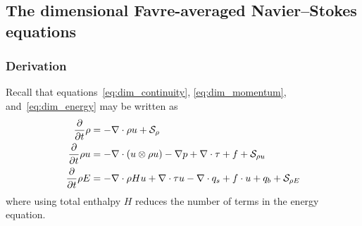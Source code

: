 \subsection{The dimensional Favre-averaged Navier--Stokes equations}

\subsubsection{Derivation}

Recall that equations~\eqref{eq:dim_continuity}, \eqref{eq:dim_momentum},
and~\eqref{eq:dim_energy} may be written as
\begin{align}
    \frac{\partial}{\partial{}t}\rho
&=
  - \nabla\cdot\rho{}u
  + \mathcal{S}_{\rho{}}
\\
    \frac{\partial{}}{\partial{}t}\rho{}u
&=
  - \nabla\cdot(u\otimes{}\rho{}u)
  - \nabla{}p + \nabla\cdot{}\tau + f
  + \mathcal{S}_{\rho{} u}
\\
    \frac{\partial}{\partial{}t} \rho{}E
&=
  - \nabla\cdot{}\rho{}Hu
  + \nabla\cdot{}\tau{}u
  - \nabla\cdot{}q_{s}
  + f\cdot{}u
  + q_b
  + \mathcal{S}_{\rho{} E}
\end{align}
where using total enthalpy $H$ reduces the number of terms in the energy
equation.


